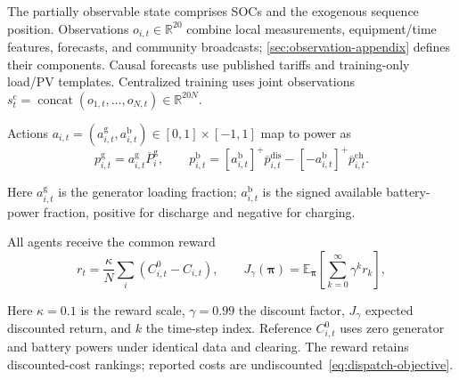 The partially observable state comprises SOCs and the exogenous sequence
position. Observations $o_{i,t}\in\mathbb R^{20}$ combine local measurements,
equipment/time features, forecasts, and community broadcasts;
\ref{sec:observation-appendix} defines their components.
Causal forecasts use published tariffs and
training-only load/PV templates. Centralized training uses joint
observations
$s_t^{\mathrm{c}}=\operatorname{concat}(o_{1,t},\ldots,o_{N,t})
\in\mathbb R^{20N}$.

Actions $a_{i,t}=(a_{i,t}^{\mathrm{g}},a_{i,t}^{\mathrm{b}})
\in[0,1]\times[-1,1]$ map to power as
\begin{equation}
 p_{i,t}^{\mathrm{g}}=a_{i,t}^{\mathrm{g}}\overline P_i^{\mathrm{g}},
 \qquad
 p_{i,t}^{\mathrm{b}}=[a_{i,t}^{\mathrm{b}}]^+\overline p_{i,t}^{\mathrm{dis}}
 -[-a_{i,t}^{\mathrm{b}}]^+\overline p_{i,t}^{\mathrm{ch}}.
 \label{eq:action-mapping}
\end{equation}

Here $a_{i,t}^{\mathrm{g}}$ is the generator loading fraction;
$a_{i,t}^{\mathrm{b}}$ is the signed available battery-power fraction,
positive for discharge and negative for charging.

All agents receive the common reward
\begin{equation}
 r_t=\frac{\kappa}{N}\sum_i(C_{i,t}^{0}-C_{i,t}),\qquad
 J_\gamma(\boldsymbol{\pi})=
 \mathbb{E}_{\boldsymbol{\pi}}\left[\sum_{k=0}^{\infty}\gamma^k r_k\right],
 \label{eq:team-reward}
\end{equation}

Here $\kappa=0.1$ is the reward scale, $\gamma=0.99$ the
discount factor, $J_\gamma$ expected discounted return, and $k$ the
time-step index. Reference $C_{i,t}^{0}$ uses zero generator and battery
powers under identical data and clearing. The reward retains discounted-cost
rankings; reported costs are undiscounted~\eqref{eq:dispatch-objective}.
